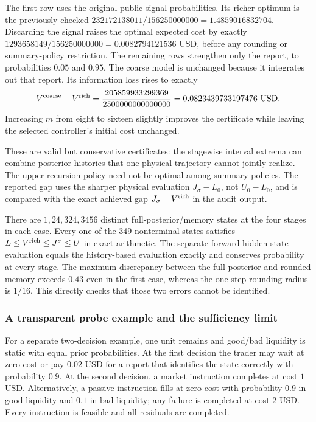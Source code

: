 The first row uses the original public-signal probabilities. Its richer
optimum is the previously checked
$232172138011/156250000000=1.4859016832704$.
Discarding the signal raises the optimal expected cost by exactly
$1293658149/156250000000=0.0082794121536$ USD, before any rounding or
summary-policy restriction. The remaining rows strengthen only the report,
to probabilities $0.05$ and $0.95$. The coarse model is unchanged because
it integrates out that report. Its information loss rises to exactly
\[
 V^{\rm coarse}-V^{\rm rich}
 =\frac{205859933299369}{2500000000000000}
 =0.0823439733197476\ \mathrm{USD}.
\]
Increasing $m$ from eight to sixteen slightly improves the
certificate while leaving the selected controller's initial cost unchanged.

These are valid but conservative certificates: the stagewise interval
extrema can combine posterior histories that one physical trajectory cannot
jointly realize. The upper-recursion policy need not be optimal among
summary policies. The reported gap uses the sharper physical evaluation
$J_\sigma-L_0$, not $U_0-L_0$, and is compared with the exact achieved gap
$J_\sigma-V^{\rm rich}$ in the audit output.

There are $1,24,324,3456$ distinct full-posterior/memory states at the four
stages in each case. Every one of the 349 nonterminal states satisfies
$L\le V^{\rm rich}\le J^\sigma\le U$ in exact arithmetic. The separate
forward hidden-state evaluation equals the history-based evaluation exactly
and conserves probability at every stage. The maximum discrepancy between
the full posterior and rounded memory exceeds $0.43$ even in the first
case, whereas the one-step rounding radius is $1/16$. This directly checks
that those two errors cannot be identified.

\subsubsection*{A transparent probe example and the sufficiency limit}

For a separate two-decision example, one unit remains and good/bad liquidity
is static with equal prior probabilities. At the first decision the trader
may wait at zero cost or pay $0.02$ USD for a report that identifies the
state correctly with probability $0.9$. At the second decision, a market
instruction completes at cost $1$ USD. Alternatively, a passive instruction
fills at zero cost with probability $0.9$ in good liquidity and $0.1$ in bad
liquidity; any failure is completed at cost $2$ USD. Every instruction is
feasible and all residuals are completed.

